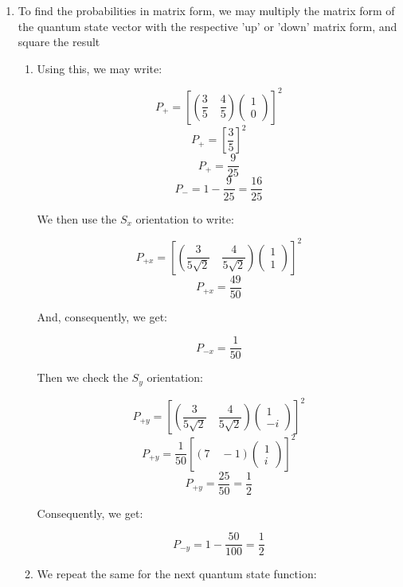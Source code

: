 \begin{enumerate}
\begin{enumerate}
\begin{enumerate}
        \end{enumerate}

      \item To find the probabilities in matrix form, we may multiply the matrix form of the quantum state vector with the respective 'up' or 'down' matrix form, and square the result

        \begin{enumerate}

          \item Using this, we may write:

            $$P_+=\left[\left( \dfrac{3}{5}\quad \dfrac{4}{5} \right)\left( \begin{matrix} 1\\ 0\end{matrix} \right)\right]^2$$
            $$P_+=\left[\frac{3}{5}\right]^2$$
            $$\boxed{P_+=\frac{9}{25}}$$
            $$\boxed{P_-=1-\frac{9}{25}=\frac{16}{25}}$$

            We then use the $S_x$ orientation to write:

            $$P_{+x}=\left[\left( \dfrac{3}{5\sqrt{2}}\quad \dfrac{4}{5\sqrt{2}} \right)\left( \begin{matrix} 1\\ 1\end{matrix} \right)\right]^2$$
            $$\boxed{P_{+x}=\frac{49}{50}}$$

            And, consequently, we get:

            $$\boxed{P_{-x}=\frac{1}{50}}$$

            Then we check the $S_y$ orientation:

            $$P_{+y}=\left[\left( \dfrac{3}{5\sqrt{2}}\quad \dfrac{4}{5\sqrt{2}} \right)\left( \begin{matrix} 1\\ -i\end{matrix} \right)\right]^2$$
            $$P_{+y}=\frac{1}{50}\left[\left( 7\quad -1\right)\left( \begin{matrix} 1\\ i\end{matrix} \right)\right]^2$$
            $$\boxed{P_{+y}=\frac{25}{50}=\frac{1}{2}}$$

            Consequently, we get:

            $$\boxed{P_{-y}=1-\frac{50}{100}=\frac{1}{2}}$$

          \item We repeat the same for the next quantum state function:


\end{enumerate}
\end{enumerate}
\end{enumerate}
